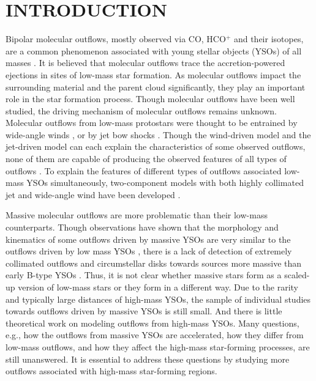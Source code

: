 \section{INTRODUCTION}
Bipolar molecular outflows, mostly observed via CO, HCO$^+$ and their isotopes, are a common phenomenon associated with young stellar objects (YSOs) of all masses \citep{2001ApJ...552L.167Z, 2002A&A...383..892B, 2004A&A...426..503W, 2005AJ....129..330W,  2015MNRAS.453..645M}. It is believed that molecular outflows trace the accretion-powered ejections in sites of low-mass star formation. As molecular outflows impact the surrounding material and the parent cloud significantly, they play an important role in the star formation process. Though molecular outflows have been well studied, the driving mechanism of molecular outflows remains unknown. Molecular outflows from low-mass protostars were thought to be entrained by wide-angle winds \citep{1991ApJ...370L..31S, 2001ApJ...557..429L}, or by jet bow shocks \citep{ 1993A&A...278..267R, 1993ApJ...414..230M, 2001ApJ...557..429L}. Though the wind-driven model and the jet-driven model can each explain the characteristics of some observed outflows, none of them are capable of producing the observed features of all types of outflows \citep{2000ApJ...542..925L, 2002ApJ...576..294L}. To explain the features of different types of outflows associated low-mass YSOs simultaneously, two-component models with both highly collimated jet and wide-angle wind have been developed \citep{2000prpl.conf..789S, 2006ApJ...641..949B, 2006MNRAS.365.1131P, 2006ApJ...649..845S, 2007prpl.conf..277P, 2008ApJ...676.1088M}.

Massive molecular outflows are more problematic than their low-mass counterparts. Though observations have shown that the morphology and kinematics of some outflows driven by massive YSOs are very similar to the outflows driven by low mass YSOs \citep[][]{1998ApJ...507..861S, 2002A&A...387..931B, 2009ApJ...696...66Q, 2011MNRAS.415L..49R}, there is a lack of detection of extremely collimated outflows and circumstellar disks towards sources more massive than early B-type YSOs \citep{2007prpl.conf..245A}. Thus, it is not clear whether massive stars form as a scaled-up version of low-mass stars or they form in a different way. Due to the rarity and typically large distances of high-mass YSOs, the sample of individual studies towards outflows driven by massive YSOs is still small. And there is little theoretical work on modeling outflows from high-mass YSOs. Many questions, e.g., how the outflows from massive YSOs are accelerated, how they differ from low-mass outflows, and how they affect the high-mass star-forming processes, are still unanswered. It is essential to address these questions by studying more outflows associated with high-mass star-forming regions. 

